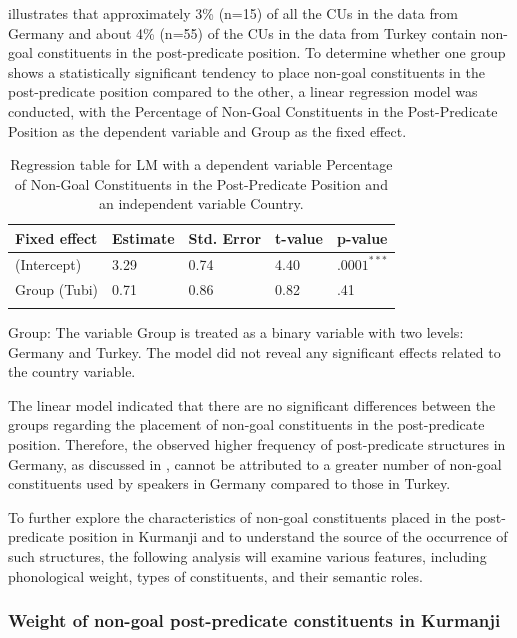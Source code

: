  illustrates that approximately 3\% (n=15) of all the CUs in the data from Germany and about 4\% (n=55) of the CUs in the data from Turkey contain non-goal constituents in the post-predicate position. To determine whether one group shows a statistically significant tendency to place non-goal constituents in the post-predicate position compared to the other, a linear regression model was conducted, with the Percentage of Non-Goal Constituents in the Post-Predicate Position as the dependent variable and Group as the fixed effect.

\begin{table}
\begin{tabularx}{\textwidth}{XYYYY}
\lsptoprule
\textbf{Fixed effect} & \textbf{Estimate} & \textbf{Std. Error} & \textbf{t-value}  & \textbf{p-value}\\
\midrule
(Intercept) & 3.29 & 0.74 & 4.40 & $.0001^{***}$\\
Group (Tubi) & 0.71 & 0.86 & 0.82 & .41 \\
\lspbottomrule
\end{tabularx}
\caption{\label{tab:key:18}Regression table for LM with a dependent variable Percentage of Non-Goal Constituents in the Post-Predicate Position and an independent variable Country.}
\end{table}

\largerpage
Group: The variable Group is treated as a binary variable with two levels: Germany and Turkey. The model did not reveal any significant effects related to the country variable.

The linear model indicated that there are no significant differences between the groups regarding the placement of non-goal constituents in the post-predicate position. Therefore, the observed higher frequency of post-predicate structures in Germany, as discussed in , cannot be attributed to a greater number of non-goal constituents used by speakers in Germany compared to those in Turkey.

To further explore the characteristics of non-goal constituents placed in the post-predicate position in Kurmanji and to understand the source of the occurrence of such structures, the following analysis will examine various features, including phonological weight, types of constituents, and their semantic roles.

\subsubsection{Weight of non-goal post-predicate constituents in Kurmanji}\label{sec:key:6.3.6.1}

